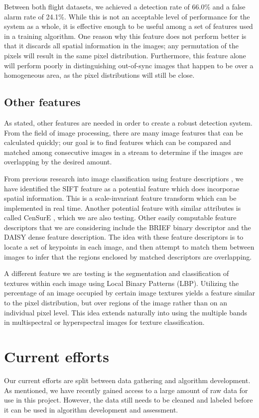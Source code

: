 Between both flight datasets, we achieved a detection rate of 66.0\% and a false alarm rate of 24.1\%.
While this is not an acceptable level of performance for the system as a whole, it is effective enough to be useful among a set of features used in a training algorithm.
One reason why this feature does not perform better is that it discards all spatial information in the images; any permutation of the pixels will result in the same pixel distribution.
Furthermore, this feature alone will perform poorly in distinguishing out-of-sync images that happen to be over a homogeneous area, as the pixel distributions will still be close.

\subsection {Other features}
As stated, other features are needed in order to create a robust detection system.
From the field of image processing, there are many image features that can be calculated quickly; our goal is to find features which can be compared and matched among consecutive images in a stream to determine if the images are overlapping by the desired amount.

From previous research into image classification using feature descriptiors \cite{anomalyhyper}, we have identified the SIFT feature as a potential feature which does incorporae spatial information.
This is a scale-invariant feature transform which can be implemented in real time.
Another potential feature with similar attributes is called CenSurE \cite{censure} , which we are also testing.
Other easily computable feature descriptors that we are considering include the BRIEF binary descriptor and the DAISY dense feature description.
The idea with these feature descriptors is to locate a set of keypoints in each image, and then attempt to match them between images to infer that the regions enclosed by matched descriptors are overlapping.

A different feature we are testing is the segmentation and classification of textures within each image using Local Binary Patterns (LBP).
Utilizing the percentage of an image occupied by certain image textures yields a feature similar to the pixel distribution, but over regions of the image rather than on an individual pixel level.
This idea extends naturally into using the multiple bands in multispectral or hyperspectral images for texture classification.


\section {Current efforts}
Our current efforts are split between data gathering and algorithm development.
As mentioned, we have recently gained access to a large amount of raw data for use in this project.
However, the data still needs to be cleaned and labeled before it can be used in algorithm development and assessment.

